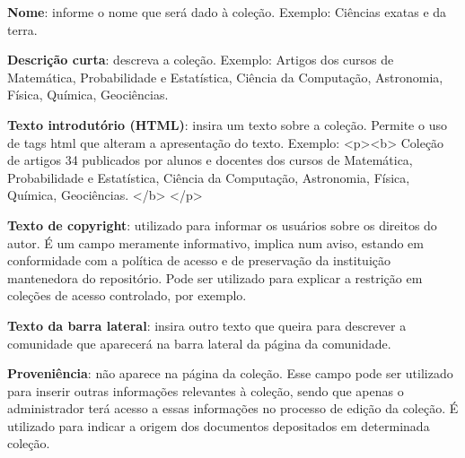 \documentclass[12pt,hidelinks]{article}
\begin{document}
\newpage

    \singlespacing 
     
    \textbullet \hspace{6pt} \textbf{Nome}: informe o nome que será dado à coleção. Exemplo: Ciências exatas e da terra.
     
    \singlespacing
     
    \textbullet \hspace{6pt} \textbf{Descrição curta}: descreva a coleção. Exemplo: Artigos dos cursos de Matemática, Probabilidade e Estatística, Ciência da Computação, Astronomia, Física, Química, Geociências.
    
    \singlespacing
     
    \textbullet \hspace{6pt} \textbf{Texto introdutório (HTML)}: insira um texto sobre a coleção. Permite o uso de tags html que alteram a apresentação do texto. Exemplo: <p><b> Coleção de artigos 34 publicados por alunos e docentes dos cursos de Matemática, Probabilidade e Estatística, Ciência da Computação, Astronomia, Física, Química, Geociências. </b> </p>
    
    \singlespacing
     
    \textbullet \hspace{6pt} \textbf{Texto de copyright}: utilizado para informar os usuários sobre os direitos do autor. É um campo meramente informativo, implica num aviso, estando em conformidade com a política de acesso e de preservação da instituição mantenedora do repositório. Pode ser utilizado para explicar a restrição em coleções de acesso controlado, por exemplo.
    
    \singlespacing
     
    \textbullet \hspace{6pt} \textbf{Texto da barra lateral}: insira outro texto que queira para descrever a comunidade que aparecerá na barra lateral da página da comunidade.
    
    \singlespacing
     
    \textbullet \hspace{6pt} \textbf{Proveniência}: não aparece na página da coleção. Esse campo pode ser utilizado para inserir outras informações relevantes à coleção, sendo que apenas o administrador terá acesso a essas informações no processo de edição da coleção. É utilizado para indicar a origem dos documentos depositados em determinada coleção.
    
    \singlespacing
    
\end{document}
